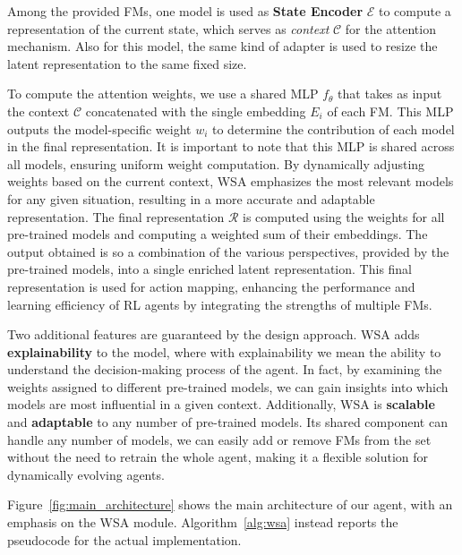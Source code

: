 Among the provided FMs, one model is used as \textbf{State Encoder} $\mathcal{E}$ to compute a representation of the current state, which serves as \textit{context} $\mathcal{C}$ for the attention mechanism.
Also for this model, the same kind of adapter is used to resize the latent representation to the same fixed size.


To compute the attention weights, we use a shared MLP $f_\theta$ that takes as input the context $\mathcal{C}$ concatenated with the single embedding $E_i$ of each FM\@.
This MLP outputs the model-specific weight $w_i$ to determine the contribution of each model in the final representation.
It is important to note that this MLP is shared across all models, ensuring uniform weight computation.
By dynamically adjusting weights based on the current context, WSA emphasizes the most relevant models for any given situation, resulting in a more accurate and adaptable representation.
The final representation $\mathcal{R}$ is computed using the weights for all pre-trained models and computing a weighted sum of their embeddings.
The output obtained is so a combination of the various perspectives, provided by the pre-trained models, into a single enriched latent representation.
This final representation is used for action mapping, enhancing the performance and learning efficiency of RL agents by integrating the strengths of multiple FMs.


Two additional features are guaranteed by the design approach.
WSA adds \textbf{explainability} to the model, where with explainability we mean the ability to understand the decision-making process of the agent.
In fact, by examining the weights assigned to different pre-trained models, we can gain insights into which models are most influential in a given context.
Additionally, WSA is \textbf{scalable} and \textbf{adaptable} to any number of pre-trained models.
Its shared component can handle any number of models, we can easily add or remove FMs from the set without the need to retrain the whole agent, making it a flexible solution for dynamically evolving agents.

Figure~\ref{fig:main_architecture} shows the main architecture of our agent, with an emphasis on the WSA module.
Algorithm~\ref{alg:wsa} instead reports the pseudocode for the actual implementation.


